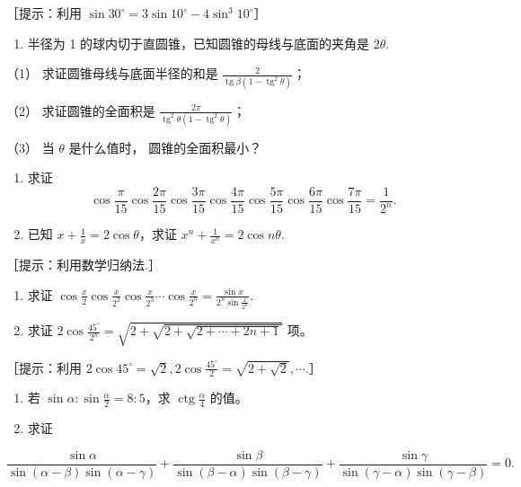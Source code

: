 ［提示：利用
\(\sin 30^{\circ} = 3\sin 10^{\circ} - 4\sin^{3}10^{\circ}\)］

\begin{enumerate}[start=30]
\item
  半径为 1 的球内切于直圆锥，已知圆锥的母线与底面的夹角是 \(2\theta\).
\end{enumerate}

（1） 求证圆锥母线与底面半径的和是
\(\frac{2}{\operatorname{tg}\beta(1-\operatorname{tg}^{2}\theta)}\)；

（2） 求证圆锥的全面积是
\(\frac{2\pi}{\operatorname{tg}^{2}\theta(1-\operatorname{tg}^{2}\theta)}\)；

（3） 当 \(\theta\) 是什么值时， 圆锥的全面积最小？

\begin{enumerate}[start=31]
\item
  求证
\[
\cos \frac {\pi}{15} \cos \frac {2 \pi}{15} \cos \frac {3 \pi}{15} \cos \frac {4 \pi}{15} \cos \frac {5 \pi}{15} \cos \frac {6 \pi}{15} \cos \frac {7 \pi}{15} = \frac {1}{2 ^ {n}}.
\]
\item
  已知 \(x + \frac{1}{x} = 2\cos \theta\)，求证
  \(x^n + \frac{1}{x^n} = 2\cos n\theta\).
\end{enumerate}

［提示：利用数学归纳法.］

\begin{enumerate}[start=33]
\item
  求证
  \(\cos \frac{x}{2} \cos \frac{x}{2^2} \cos \frac{x}{2^3} \cdots \cos \frac{x}{2^n} = \frac{\sin x}{2^n \sin \frac{x}{2^n}}\).
\item
  求证
  \(2\cos \frac{45^{\circ}}{2^{n}} = \sqrt{2 + \sqrt{2 + \sqrt{2 + \cdots + 2n + 1}}}\)
  项。
\end{enumerate}

［提示：利用
\(2\cos 45^{\circ} = \sqrt{2}, 2\cos \frac{45^{\circ}}{2} = \sqrt{2 + \sqrt{2}}, \cdots.\)］

\begin{enumerate}[start=35]
\item
  若 \(\sin \alpha: \sin \frac{\alpha}{2} = 8:5\)，求
  \(\operatorname{ctg} \frac{\alpha}{4}\) 的值。
\item
  求证
\end{enumerate}

\[
\frac {\sin \alpha}{\sin (\alpha - \beta) \sin (\alpha - \gamma)} + \frac {\sin \beta}{\sin (\beta - \alpha) \sin (\beta - \gamma)} + \frac {\sin \gamma}{\sin (\gamma - \alpha) \sin (\gamma - \beta)} = 0.
\]

